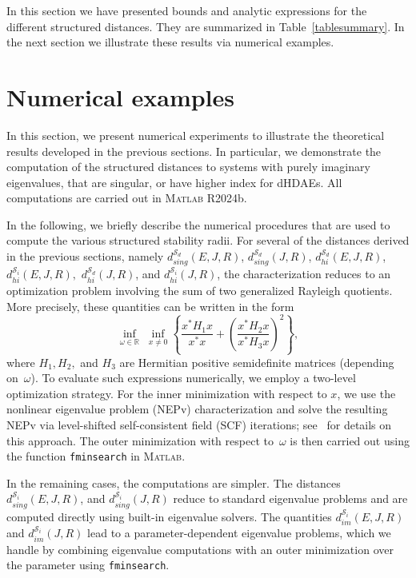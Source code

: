 \documentclass[11pt]{article}
\begin{document}
In this section we have presented
bounds and analytic expressions for  the different structured distances. They are summarized in Table~\ref{tablesummary}. In the next section we illustrate these results via  numerical examples.

\section{Numerical examples}\label{sec:numerical}
In this section, we present numerical experiments to illustrate the theoretical results developed in the previous sections. In particular, we demonstrate the computation of the structured distances to systems with purely imaginary  eigenvalues, that are singular, or have higher index for dHDAEs. All computations are carried out in \textsc{Matlab} R2024b. %

In the following, we briefly describe the numerical procedures that are used to compute the various structured stability radii. For several of the distances derived in the previous sections, namely
$d_{sing}^{\mathcal S_d}(E,J,R)$, $d_{sing}^{\mathcal S_d}(J,R)$, $d_{hi}^{\mathcal S_d}(E,J,R)$, $d_{hi}^{\mathcal S_i}(E,J,R),$ $d_{hi}^{\mathcal S_d}(J,R)$, and $d_{hi}^{\mathcal S_i}(J,R)$, the characterization reduces to an optimization problem involving the sum of two generalized Rayleigh quotients. More precisely, these quantities can be written in the form
\[
\inf_{\omega \in \mathbb{R}} \; \inf_{x \neq 0} \left\{ \frac{x^* H_1 x}{x^* x} + \left(\frac{x^* H_2 x}{x^* H_3 x}\right)^2 \right\},
\]
where $H_1, H_2,$ and $H_3$ are Hermitian positive semidefinite matrices (depending on~\(\omega\)).
%
To evaluate such expressions numerically, we employ a two-level optimization strategy. For the inner minimization with respect to $x$, we use the nonlinear eigenvalue problem (NEPv) characterization and solve the resulting NEPv via level-shifted self-consistent field (SCF) iterations; see~\cite{LuPSB25} for details on this approach. The outer minimization with respect to~\(\omega\) is then carried out using the function \texttt{fminsearch} in \textsc{Matlab}.

In the remaining cases, the computations are simpler. The distances
$d_{sing}^{\mathcal S_i}(E,J,R)$, and $d_{sing}^{\mathcal S_i}(J,R)$ reduce to standard eigenvalue problems and are computed directly using built-in eigenvalue solvers. The quantities $d_{im}^{\mathcal S_i}(E,J,R)$ and $d_{im}^{\mathcal S_i}(J,R)$ lead to a parameter-dependent eigenvalue problems, which we handle by combining eigenvalue computations with an outer minimization over the parameter using \texttt{fminsearch}.
\end{document}
